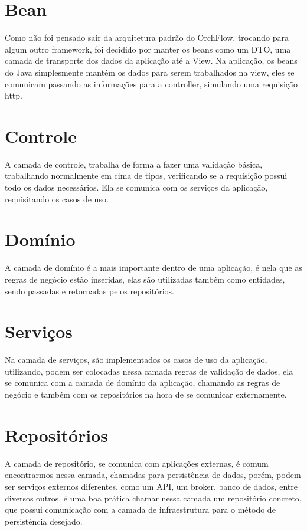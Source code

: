 \documentclass[
	article,			%
	11pt,				%
	oneside,			%
	a4paper,			%
	english,			%
	brazil,				%
	sumario=tradicional
	]{abntex2}
\begin{document}
{
\section{Bean}

Como não foi pensado sair da arquitetura padrão do OrchFlow, trocando para algum outro framework, foi decidido por manter os beans como um DTO, uma camada de transporte dos dados da aplicação até a View.
Na aplicação, os beans do Java simplesmente mantém os dados para serem trabalhados na view, eles se comunicam passando as informações para a controller, simulando uma requisição http.

\section{Controle}

A camada de controle, trabalha de forma a fazer uma validação básica, trabalhando normalmente em cima de tipos, verificando se a requisição possui todo os dados necessários.
Ela se comunica com os serviços da aplicação, requisitando os casos de uso.

\section{Domínio}

A camada de domínio é a mais importante dentro de uma aplicação, é nela que as regras de negócio estão inseridas, elas são utilizadas também como entidades, sendo passadas e retornadas pelos repositórios.

\section{Serviços}

Na camada de serviços, são implementados os casos de uso da aplicação, utilizando, podem ser colocadas nessa camada regras de validação de dados, ela se comunica com a camada de domínio da aplicação, chamando as regras de negócio e também com os repositórios na hora de se comunicar externamente.

\section{Repositórios}

A camada de repositório, se comunica com aplicações externas, é comum encontrarmos nessa camada, chamadas para persistência de dados, porém, podem ser serviços externos diferentes, como um API, um broker, banco de dados, entre diversos outros, é uma boa prática chamar nessa camada um repositório concreto, que possui comunicação com a camada de infraestrutura para o método de persistência desejado.

}
\end{document}
